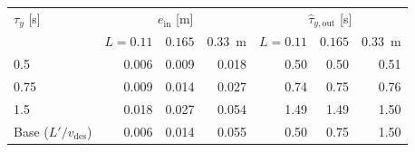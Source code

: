 \begin{tabular}{lrrrrrr}
\toprule
$\tau_y$ [s] & \multicolumn{3}{c}{$e_{\mathrm{in}}$ [m]} & \multicolumn{3}{c}{$\hat{\tau}_{y,\mathrm{out}}$ [s]} \\
 & $L=0.11$ & $0.165$ & $0.33$~m & $L=0.11$ & $0.165$ & $0.33$~m \\
\midrule
0.5 & 0.006 & 0.009 & 0.018 & 0.50 & 0.50 & 0.51 \\
0.75 & 0.009 & 0.014 & 0.027 & 0.74 & 0.75 & 0.76 \\
1.5 & 0.018 & 0.027 & 0.054 & 1.49 & 1.49 & 1.50 \\
Base ($L'/v_{\mathrm{des}}$) & 0.006 & 0.014 & 0.055 & 0.50 & 0.75 & 1.50 \\
\bottomrule
\end{tabular}
